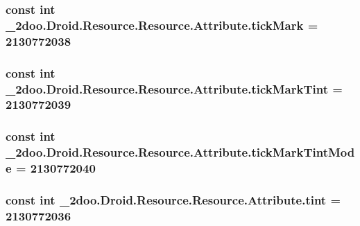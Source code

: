 \hypertarget{class__2doo_1_1_droid_1_1_resource_1_1_attribute_ec1123bc6f3961ecc26950b56df6b396}{
\subsubsection[{tickMark}]{\setlength{\rightskip}{0pt plus 5cm}const int \_\-2doo.Droid.Resource.Resource.Attribute.tickMark = 2130772038}}
\label{class__2doo_1_1_droid_1_1_resource_1_1_attribute_ec1123bc6f3961ecc26950b56df6b396}


\hypertarget{class__2doo_1_1_droid_1_1_resource_1_1_attribute_19f2c636f5cad21c525a5e9672103885}{
\subsubsection[{tickMarkTint}]{\setlength{\rightskip}{0pt plus 5cm}const int \_\-2doo.Droid.Resource.Resource.Attribute.tickMarkTint = 2130772039}}
\label{class__2doo_1_1_droid_1_1_resource_1_1_attribute_19f2c636f5cad21c525a5e9672103885}


\hypertarget{class__2doo_1_1_droid_1_1_resource_1_1_attribute_05f358756dd64d7f7a322a8cde068530}{
\subsubsection[{tickMarkTintMode}]{\setlength{\rightskip}{0pt plus 5cm}const int \_\-2doo.Droid.Resource.Resource.Attribute.tickMarkTintMode = 2130772040}}
\label{class__2doo_1_1_droid_1_1_resource_1_1_attribute_05f358756dd64d7f7a322a8cde068530}


\hypertarget{class__2doo_1_1_droid_1_1_resource_1_1_attribute_84a957fe8d6d8c9c2460e5628806a71f}{
\subsubsection[{tint}]{\setlength{\rightskip}{0pt plus 5cm}const int \_\-2doo.Droid.Resource.Resource.Attribute.tint = 2130772036}}
\label{class__2doo_1_1_droid_1_1_resource_1_1_attribute_84a957fe8d6d8c9c2460e5628806a71f}


